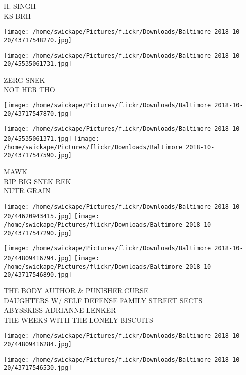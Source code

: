 \documentclass[10pt,letterpaper]{article}
\begin{document}
H. SINGH\\
KS BRH\\
\pagebreak

\texttt{[image: /home/swickape/Pictures/flickr/Downloads/Baltimore 2018-10-20/43717548270.jpg]}

\vspace{0.25in}
\texttt{[image: /home/swickape/Pictures/flickr/Downloads/Baltimore 2018-10-20/45535061731.jpg]}

ZERG SNEK\\
NOT HER THO\\
\pagebreak

\texttt{[image: /home/swickape/Pictures/flickr/Downloads/Baltimore 2018-10-20/43717547870.jpg]}

\vspace{0.25in}
\texttt{[image: /home/swickape/Pictures/flickr/Downloads/Baltimore 2018-10-20/45535061371.jpg]}
\texttt{[image: /home/swickape/Pictures/flickr/Downloads/Baltimore 2018-10-20/43717547590.jpg]}

MAWK\\
RIP BIG SNEK REK\\
NUTR GRAIN\\
\pagebreak

\texttt{[image: /home/swickape/Pictures/flickr/Downloads/Baltimore 2018-10-20/44620943415.jpg]}
\texttt{[image: /home/swickape/Pictures/flickr/Downloads/Baltimore 2018-10-20/43717547290.jpg]}

\texttt{[image: /home/swickape/Pictures/flickr/Downloads/Baltimore 2018-10-20/44809416794.jpg]}
\texttt{[image: /home/swickape/Pictures/flickr/Downloads/Baltimore 2018-10-20/43717546890.jpg]}

THE BODY AUTHOR \& PUNISHER CURSE\\
DAUGHTERS W/ SELF DEFENSE FAMILY STREET SECTS\\
ABYSSKISS ADRIANNE LENKER\\
THE WEEKS WITH THE LONELY BISCUITS\\
\pagebreak

\texttt{[image: /home/swickape/Pictures/flickr/Downloads/Baltimore 2018-10-20/44809416284.jpg]}

\vspace{0.25in}
\texttt{[image: /home/swickape/Pictures/flickr/Downloads/Baltimore 2018-10-20/43717546530.jpg]}
\end{document}
